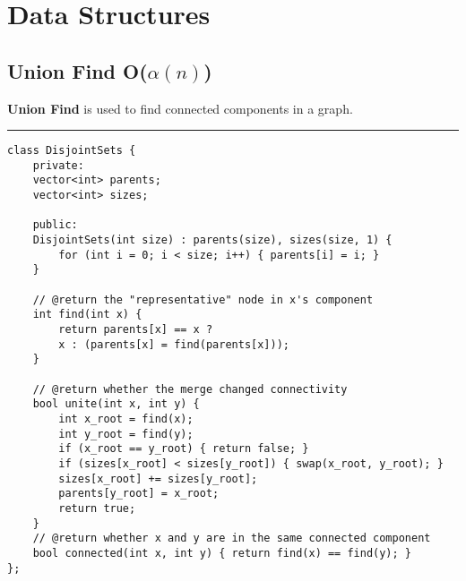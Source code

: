 \documentclass{article}
\begin{document}
\pagebreak

\section{Data Structures}

\subsection{Union Find O($\alpha(n)$)}

\textbf{Union Find} is used to find connected components in a graph.

\noindent\rule{\textwidth}{1pt}

\begin{verbatim}
class DisjointSets {
    private:
    vector<int> parents;
    vector<int> sizes;

    public:
    DisjointSets(int size) : parents(size), sizes(size, 1) {
        for (int i = 0; i < size; i++) { parents[i] = i; }
    }

    // @return the "representative" node in x's component
    int find(int x) { 
        return parents[x] == x ? 
        x : (parents[x] = find(parents[x])); 
    }

    // @return whether the merge changed connectivity
    bool unite(int x, int y) {
        int x_root = find(x);
        int y_root = find(y);
        if (x_root == y_root) { return false; }
        if (sizes[x_root] < sizes[y_root]) { swap(x_root, y_root); }
        sizes[x_root] += sizes[y_root];
        parents[y_root] = x_root;
        return true;
    }
    // @return whether x and y are in the same connected component
    bool connected(int x, int y) { return find(x) == find(y); }
};
\end{verbatim}
\end{document}
